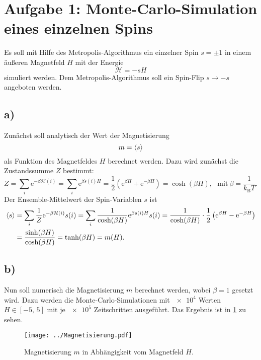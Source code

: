 
\section*{Aufgabe 1: Monte-Carlo-Simulation eines einzelnen Spins}
Es soll mit Hilfe des Metropolis-Algorithmus ein einzelner Spin $s=\pm1$ in einem äußeren Magnetfeld $H$ mit der Energie \[\mathcal{H}=-sH\] simuliert werden.
Dem Metropolis-Algorithmus soll ein Spin-Flip $s\rightarrow-s$ angeboten werden.
\subsection*{a)}
Zunächst soll analytisch der Wert der Magnetisierung \[m=\braket{s}\] als Funktion des Magnetfeldes $H$ berechnet werden.
Dazu wird zunächst die Zustandssumme $Z$ bestimmt: \[Z=\sum_{i}\mathrm{e}^{-\beta\mathcal{H}(i)}=\sum_{i}\mathrm{e}^{\beta s(i)H}=\frac{1}{2}\left(\mathrm{e}^{\beta H}+\mathrm{e}^{-\beta H}\right)=\cosh(\beta H),~~~\text{mit}~\beta=\frac{1}{k_\text{B}T}.\]
Der Ensemble-Mittelwert der Spin-Variablen $s$ ist
\begin{align*}\braket{s}&=\sum_{i}\frac{1}{Z}\mathrm{e}^{-\beta\mathcal{H}(i)}s(i)=\sum_{i}\frac{1}{\cosh(\beta H)}\mathrm{e}^{\beta s(i)H}s(i)=\frac{1}{\cosh(\beta H)}\cdot\frac{1}{2}\left(\mathrm{e}^{\beta H}-\mathrm{e}^{-\beta H}\right)\\
&=\frac{\sinh(\beta H)}{\cosh(\beta H)}=\tanh(\beta H)=m(H).\end{align*}

\subsection*{b)}
Nun soll numerisch die Magnetisierung $m$ berechnet werden, wobei $\beta=1$ gesetzt wird.
Dazu werden die Monte-Carlo-Simulationen mit $\num{e4}$ Werten $H\in[-5,\,5]$ mit je $\num{e5}$ Zeitschritten ausgeführt.
Das Ergebnis ist in \cref{fig:Magnetisierung} zu sehen.

\begin{figure}
\centering
\texttt{[image: ../Magnetisierung.pdf]}
\caption{Magnetisierung $m$ in Abhängigkeit vom Magnetfeld $H$.}
\label{fig:Magnetisierung}
\end{figure}